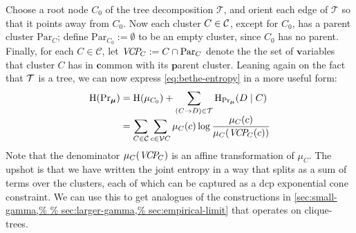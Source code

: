 \documentclass[twoside]{article}
\begin{document}
\def\Par{\mathrm{Par}}
\def\Pash{\mathit{V\mskip-5muC\mskip-3.5muP\!}}

Choose a root node $C_0$ of the tree decomposition $\mathcal T$, and orient each edge of $\mathcal T$ so that it points away from $C_0$.
Now each cluster $C \in \cal C$, except for $C_0$, has a parent cluster $\Par_C$;
define $\Par_{C_0} := \emptyset$ to be an empty cluster, since $C_0$ has no parent.
Finally, for each $C \in \mathcal C$, let $\Pash_C := C \mathbin{\cap} \Par_C$ denote the
the set of $\mathbf v$ariables that cluster $C$ has in $\mathbf c$ommon with its $\mathbf p$arent cluster.
Leaning again on the fact that $\cal T$ is a tree, 
we can now express \eqref{eq:bethe-entropy} in a more useful form:
%
\begin{align*}
    \H(\Pr\nolimits_{\bmu}) &=
        \H(\mu_{C_0}) +
        \sum_{(C \to D) \in \mathcal T}
        \H_{\Pr_{\bmu}}(D \mid C)\\[-1ex]
    &= \sum_{C \in \cal C} \sum_{c \in \V C}
        \mu_C(c)
        \log \frac
            {\mu_C(c)}{  \mu_C(\Pash_C(c)) }
\end{align*}
%
Note that the denominator $\mu_C(\Pash_C)$ is an affine transformation of $\mu_C$.
The upshot is that we have written the joint entropy in a way that
splits as a sum of terms over the clusters, each of which can be captured as a dcp exponential cone constraint.
We can use this to get analogues of the constructions in \cref{sec:small-gamma,%
sec:empirical-limit} that operates on clique-trees.
\end{document}
